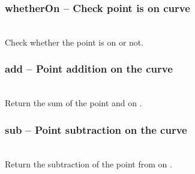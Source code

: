   \subsubsection{whetherOn -- Check point is on curve }
   \\
   \spacing
   \quad Check whether the point  is on  or not.\\
   \spacing
%
  \subsubsection{add -- Point addition on the curve}
   \\
   \spacing
   \quad Return the sum of the point  and  on .\\
   \spacing
%
  \subsubsection{sub -- Point subtraction on the curve}
   \\
   \spacing
   \quad Return the subtraction of the point  from  on .\\
   \spacing
%
